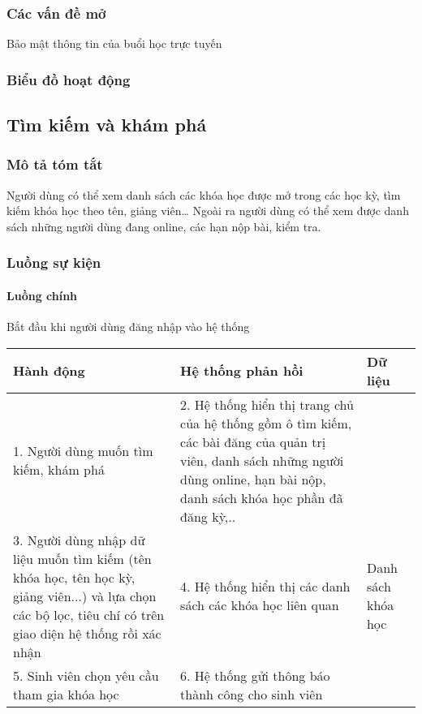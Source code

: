 \documentclass[./../main_file.tex]{subfiles}
\begin{document}
\subsubsection{Các vấn đề mở}
Bảo mật thông tin của buổi học trực tuyến

\subsubsection{Biểu đồ hoạt động}

\subsection{Tìm kiếm và khám phá}
\subsubsection{Mô tả tóm tắt}
Người dùng có thể xem danh sách các khóa học được mở trong các học kỳ, tìm kiếm khóa học theo tên, giảng viên… Ngoài ra người dùng có thể xem được danh sách những người dùng đang online, các hạn nộp bài, kiểm tra.

\subsubsection{Luồng sự kiện}
\paragraph{Luồng chính}
Bắt đầu khi người dùng đăng nhập vào hệ thống
\begin{longtable}{|p{}|p{}|p{}|}
		\hline
		\textbf{Hành động}                          & \textbf{Hệ thống phản hồi}                         & \textbf{Dữ liệu} \\ \hline
		1. Người dùng muốn tìm kiếm, khám phá &
		2. Hệ thống hiển thị trang chủ của hệ thống gồm ô tìm kiếm, các bài đăng của quản trị viên, danh sách những người dùng online, hạn bài nộp, danh sách khóa học phần đã đăng kỳ,.. &
		\\ \hline
		3. Người dùng nhập dữ liệu muốn tìm kiếm (tên khóa học, tên học kỳ, giảng viên...) và lựa chọn các bộ lọc, tiêu chí có trên giao diện hệ thống rồi xác nhận &
		4. Hệ thống hiển thị các danh sách các khóa học liên quan &
		Danh sách khóa học \\ \hline
		5. Sinh viên chọn  yêu cầu tham gia khóa học & 6. Hệ thống gửi thông báo thành công cho sinh viên &                  \\ \hline
\end{longtable}
\end{document}
